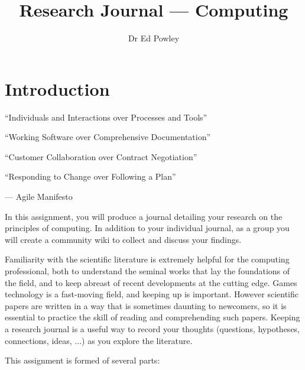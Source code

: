 \documentclass{../../fal_assignment}
\title{Research Journal --- Computing}
\author{Dr Ed Powley}
\begin{document}
\maketitle

\section*{Introduction}

\begin{marginquote}
  ``Individuals and Interactions over Processes and Tools''
  
  ``Working Software over Comprehensive Documentation''
  
  ``Customer Collaboration over Contract Negotiation''
  
  ``Responding to Change over Following a Plan''
    
    --- Agile Manifesto
\end{marginquote}

In this assignment, you will produce a journal detailing your research on the principles of computing.
In addition to your individual journal, as a group you will create a community wiki to collect and discuss your findings.

Familiarity with the scientific literature is extremely helpful for the computing professional,
both to understand the seminal works that lay the foundations of the field,
and to keep abreast of recent developments at the cutting edge.
Games technology is a fast-moving field, and keeping up is important.
However scientific papers are written in a way that is sometimes daunting to newcomers,
so it is essential to practice the skill of reading and comprehending such papers.
Keeping a research journal is a useful way to record your thoughts
(questions, hypotheses, connections, ideas, ...) as you explore the literature.

This assignment is formed of several parts:
\end{document}
